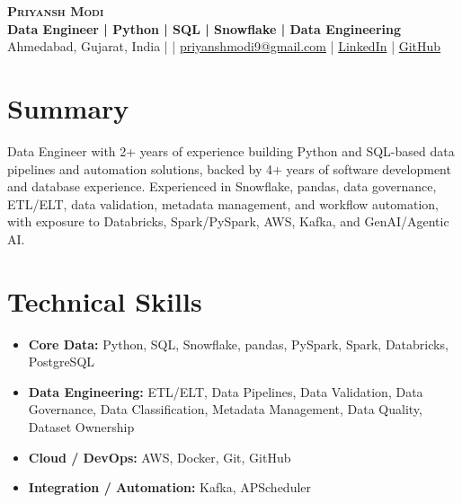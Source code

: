\documentclass[letterpaper,10pt]{article}
\begin{document}
\begin{center}
  {\fontsize{22}{24}\selectfont\bfseries\scshape Priyansh Modi}\\[-1pt]
  {\small\color{Accent}\bfseries
    Data Engineer \;|\; Python \;|\; SQL \;|\; Snowflake \;|\; Data Engineering
  }\\[3pt]
  \small
  Ahmedabad, Gujarat, India \;| \;|\;
  \href{mailto:priyanshmodi9@gmail.com}{priyanshmodi9@gmail.com} \;|\;
  \href{https://www.linkedin.com/in/priyanshmodi09/}{LinkedIn} \;|\;
  \href{https://github.com/LeGi0N09}{GitHub}
\end{center}

\vspace{-4pt}

\section{Summary}
\small{
Data Engineer with 2+ years of experience building Python and SQL-based data pipelines and automation solutions, backed by 4+ years of software development and database experience. Experienced in Snowflake, pandas, data governance, ETL/ELT, data validation, metadata management, and workflow automation, with exposure to Databricks, Spark/PySpark, AWS, Kafka, and GenAI/Agentic AI.
}

\section{Technical Skills}
\begin{itemize}[
  leftmargin=0.12in,
  label={},
  itemsep=2pt,
  topsep=0pt,
  parsep=0pt
]
\small
\item{\textbf{Core Data:} Python, SQL, Snowflake, pandas, PySpark, Spark, Databricks, PostgreSQL}\\[-1pt]
\item{\textbf{Data Engineering:} ETL/ELT, Data Pipelines, Data Validation, Data Governance, Data Classification, Metadata Management, Data Quality, Dataset Ownership}\\[-1pt]
\item{\textbf{Cloud / DevOps:} AWS, Docker, Git, GitHub}\\[-1pt]
\item{\textbf{Integration / Automation:} Kafka, APScheduler}\\[-1pt]
\end{itemize}
\end{document}
